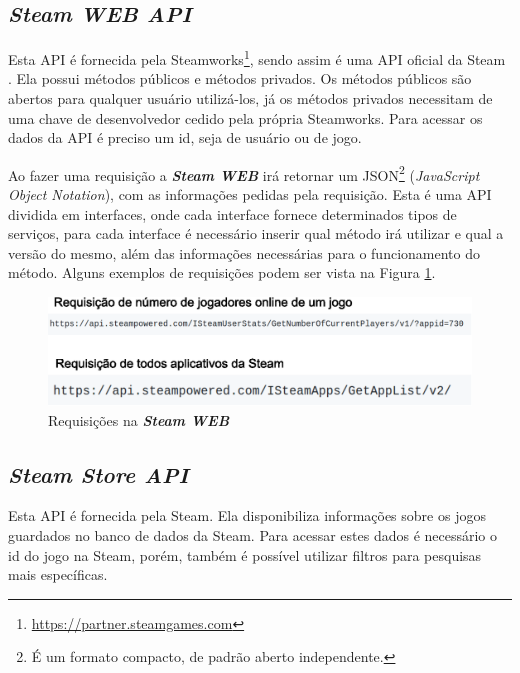 \subsection*{\textit{Steam WEB API}}
Esta API é fornecida pela Steamworks\footnote[4]{\url{https://partner.steamgames.com}}, sendo assim é uma API oficial da Steam \cite{steam_api}. Ela possui métodos públicos e métodos privados. Os métodos públicos são abertos para qualquer usuário utilizá-los, já os métodos privados necessitam de uma chave de desenvolvedor cedido pela própria Steamworks. Para acessar os dados da API é preciso um id, seja de usuário ou de jogo.

Ao fazer uma requisição a \textit{\textbf{Steam WEB}} irá retornar um JSON\footnote[5]{É um formato compacto, de padrão aberto independente.} (\textit{JavaScript Object Notation}), com as informações pedidas pela requisição. Esta é uma API dividida em interfaces, onde cada interface fornece determinados tipos de serviços, para cada interface é necessário inserir qual método irá utilizar e qual a versão do mesmo, além das informações necessárias para o funcionamento do método. Alguns exemplos de requisições podem ser vista na Figura \ref{image:requiWeb}.
\begin{figure} [H]
\centering
\includegraphics[scale=0.5]{figuras/requisicaoWeb.eps}
\caption{Requisições na \textit{\textbf{Steam WEB}}}
\label{image:requiWeb}
\end{figure}

\subsection*{\textit{Steam Store API}}
Esta API é fornecida pela Steam. Ela disponibiliza informações sobre os jogos guardados no banco de dados da Steam. Para acessar estes dados é necessário o id do jogo na Steam, porém, também é possível utilizar filtros para pesquisas mais específicas.

